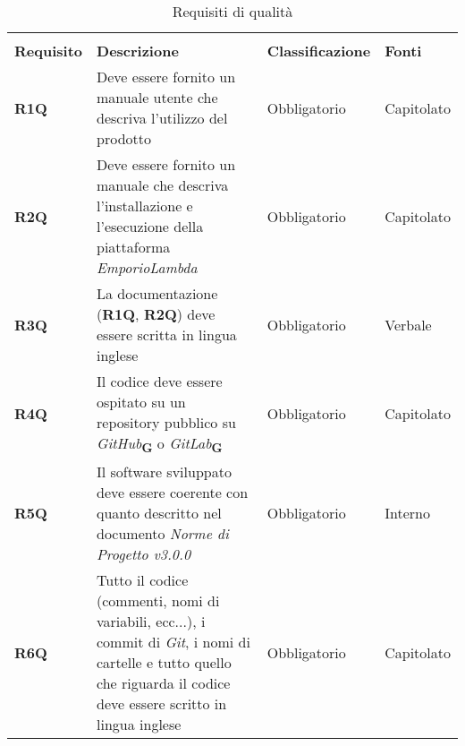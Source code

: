\begin{center}
    \centering
    \renewcommand{\arraystretch}{1.8}
    \label{tab:RequisitiQualita}
    \begin{longtable}[!h]{p{50px} p{200px} p{100px} p{50px}}
        \rowcolor{white}\caption{Requisiti di qualità}                                                                                                                                                                                                                                    \\
        \rowcolor{logo!70} \textbf{Requisito} & \textbf{Descrizione}                                                                                                                                                            & \textbf{Classificazione} & \textbf{Fonti}               \\
        \textbf{R1Q}                          & Deve essere fornito un manuale utente che descriva l'utilizzo del prodotto                                                                                                      & Obbligatorio             & Capitolato                   \\
        \textbf{R2Q}                          & Deve essere fornito un manuale che descriva l'installazione e l'esecuzione della piattaforma \textit{EmporioLambda}                                                             & Obbligatorio             & Capitolato                   \\
        \textbf{R3Q}                          & La documentazione (\textbf{R1Q}, \textbf{R2Q}) deve essere scritta in lingua inglese                                                                                            & Obbligatorio             & Verbale                      \\
        \textbf{R4Q}                          & Il codice deve essere ospitato su un repository pubblico su \textit{GitHub}\textsubscript{\textbf{G}} o \textit{GitLab}\textsubscript{\textbf{G}}                               & Obbligatorio             & Capitolato                   \\
        \textbf{R5Q}                          & Il software sviluppato deve essere coerente con quanto descritto nel documento \textit{Norme di Progetto v3.0.0}                                                                & Obbligatorio             & Interno                      \\
        \textbf{R6Q}                          & Tutto il codice (commenti, nomi di variabili, ecc...), i commit di \textit{Git}, i nomi di cartelle e tutto quello che riguarda il codice deve essere scritto in lingua inglese & Obbligatorio             & Capitolato                   \\

\end{longtable}
\end{center}
